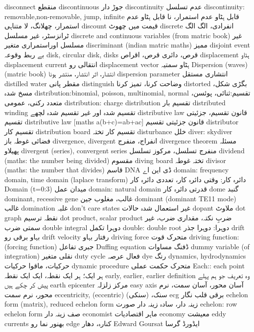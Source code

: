 disconnect	منقطع
discontinuous	جوڑ دار
discontinuity	عدم تسلسل
discontinuity: removable,non-removable, jump, infinite	قابل ہٹاو عدم استمرار، نا قابل ہٹاو عدم استمرار، چھلانگ، لا متناہی
discount	قیمت میں چھوٹ
discrete	انفرادی، الگ الگ ٹرانزسٹر، غیر مسلسل
discrete and continuous variables (from matric book)	غیر مسلسل اوراستمراری متغیر
discriminant (indian matric maths)	ممیز
disjoint event	بے ربط وقوعہ
disk, circular disk, disks	قرص، دائری قرص، اقراص
displacement	ہٹاو
displacement current	انتقالی رو
displacement vector	ہٹاو سمتیہ
Dispersion (waves) (matric book)	انتشار، اثر انتشار، منتشر ہونا
dispersion parameter	انتشاری مستقل
distilled water	مقطر پانی
distinguish	وضاحت کرنا، تمیز کرنا
distorted	بگڑی شکل، مسخ شدہ
distribution:binomial, poisson, multinomial, normal	تقسیم:ثنائی، پوئسن، متعدد رکنی، عمومی
distribution: charge distribution	تقسیم بار
distributed winding	تقسیم شدہ اور غیر تقسیم شدہ لچھے
distributive law	قانون تقسیم، جزئیتی تقسیم
distributive law [maths a(b+c)=ab+ac]	قانون جزئیتی تقسیم
distributor	تقسیم کار
distribution board	تقسیم کار تختہ
disturbance	خلل
diver: skydiver	فضائی غوطہ باز
divergence, divergent	انفراج، منفرج
divergence theorem	مسئلہ پھیلاو
divergent (series), convergent series	منفرج تسلسل، مرکوز تسلسل
dividend (maths: the number being divided)	مقسوم
diving board	تختہ غوطہ
divisor (maths: the number that divides)	قاسم
DNA	ڈی این اے
domain: frequency domain, time domain (laplace transform)	دائرہ کار: وقتی دائرہ کار، تعددی دائرہ کار
Domain (t=0:3)	میدان عمل
domain: natural domain	قدرتی دائرہ کار
dome	گنبد
dominant, recessive gene	غالب، مغلوب جین
dominant  (dominant TE11 mode)	غالب
domination	غلبہ
don't care states	غیر استعمال شدہ حالات
dopant	ملاوٹ
dot graph	نقطہ ترسیم
dot product, scalar product	ضربِ نکتہ، مقداری ضرب، غیر سمتی ضرب
double integral	دوہرا تکمل
double: double root	دوہرا: دوہرا جذر
drift	بہاو برقی رو
drift velocity	رفتار بہاو
driving force	متحرک قوت
driving function: (forcing function)	جبری تفاعل
Duffing equation	ڈفنگ مساوات
dummy variable (of integration)	نقلی متغیر
duty cycle	فعال عرصہ
dye	رنگ
dynamics, hydrodynamics	حرکیات، ماقوا حرکیات
dynamic procedure	متحرک حکمت عملی
Each:: each point	ہر ایک؛ ہر ایک نقطہ، ایک ایک نقطہ
early, earlier, earlier definition	وہ تعریف جو ہم پہلے پیش کر چکے ہیں
earth epicenter	مرکز زلزلہ
easy axis	آسان محور، آسان سمت، نرم محور، نرم سمت
eccentricity, (eccentric)	سنک، (سنکی)
ecg	برقی قلب نگار
echelon form (matrix), reduced echelon form	زینہ دار، سادہ زینہ دار صورت
echelon: row echelon form	صف زینہ دار
economist	ماہر اقتصادیات
economy	معیشت
eddy currents	بھنور نما رو
edge	کنارہ، دھار
Edward Goursat	ایڈورڈ گرسا
